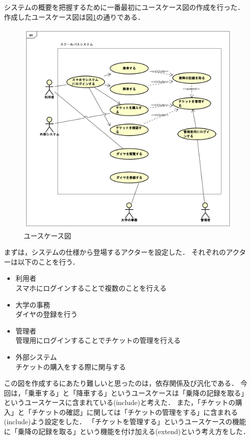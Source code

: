 \documentclass[documentclass]{jsarticle}
\begin{document}
システムの概要を把握するために一番最初にユースケース図の作成を行った．
作成したユースケース図は図\ref*{fig:1-1}の通りである．
\begin{figure}[H]
  \begin{center}
    \includegraphics*[scale=0.5]{figure/1-1.png}
  \end{center}
  \caption{ユースケース図}
  \label{fig:1-1}
\end{figure}

まずは，システムの仕様から登場するアクターを設定した．
それぞれのアクターは以下のことを行う．
\begin{itemize}
  \item 利用者 
  \\スマホにログインすることで複数のことを行える
  \item 大学の事務
  \\ダイヤの登録を行う
  \item 管理者
  \\管理用にログインすることでチケットの管理を行える
  \item 外部システム
  \\チケットの購入をする際に関与する
\end{itemize}

この図を作成するにあたり難しいと思ったのは，依存関係及び汎化である．
今回は，「乗車する」と「降車する」というユースケースは「乗降の記録を取る」というユースケースに含まれている(include)と考えた．
また，「チケットの購入」と「チケットの確認」に関しては「チケットの管理をする」に含まれる(include)よう設定をした．
「チケットを管理する」というユースケースの機能に「乗降の記録を取る」という機能を付け加える(extend)という考え方をした．
\end{document}
